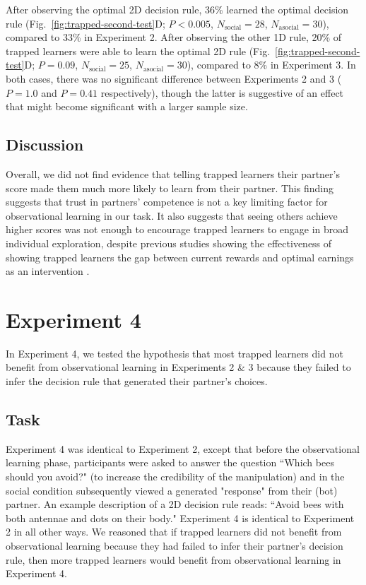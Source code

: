 \documentclass[11pt]{article} %
\begin{document}
After observing the optimal 2D decision rule, 36\% learned the optimal decision rule (Fig.~\ref{fig:trapped-second-test}D; $P<0.005$, $N_{\text{social}}=28$, $N_{\text{asocial}}=30$), compared to 33\% in Experiment 2. After observing the other 1D rule, 20\% of trapped learners were able to learn the optimal 2D rule (Fig.~\ref{fig:trapped-second-test}D; $P=0.09$, $N_{\text{social}}=25$, $N_{\text{asocial}}=30$), compared to 8\% in Experiment 3. In both cases, there was no significant difference between Experiments 2 and 3 ($P=1.0$ and $P=0.41$ respectively), though the latter is suggestive of an effect that might become significant with a larger sample size. 

\subsection{Discussion}

Overall, we did not find evidence that telling trapped learners their partner's score made them much more likely to learn from their partner. This finding suggests that trust in partners' competence is not a key limiting factor for observational learning in our task. It also suggests that seeing others achieve higher scores was not enough to encourage trapped learners to engage in broad individual exploration, despite previous studies showing the effectiveness of showing trapped learners the gap between current rewards and optimal earnings as an intervention \cite{leeOvercomingLearningTraps2023}. 

\section{Experiment 4}
In Experiment 4, we tested the hypothesis that most trapped learners did not benefit from observational learning in Experiments 2 \& 3 because they failed to infer the decision rule that generated their partner's choices. 

\subsection{Task} 
Experiment 4 was identical to Experiment 2, except that before the observational learning phase, participants were asked to answer the question ``Which bees should you avoid?" (to increase the credibility of the manipulation) and in the social condition subsequently viewed a generated "response" from their (bot) partner. An example description of a 2D decision rule reads: ``Avoid bees with both antennae and dots on their body." Experiment 4 is identical to Experiment 2 in all other ways. We reasoned that if trapped learners did not benefit from observational learning because they had failed to infer their partner's decision rule, then more trapped learners would benefit from observational learning in Experiment 4. 
\end{document}
